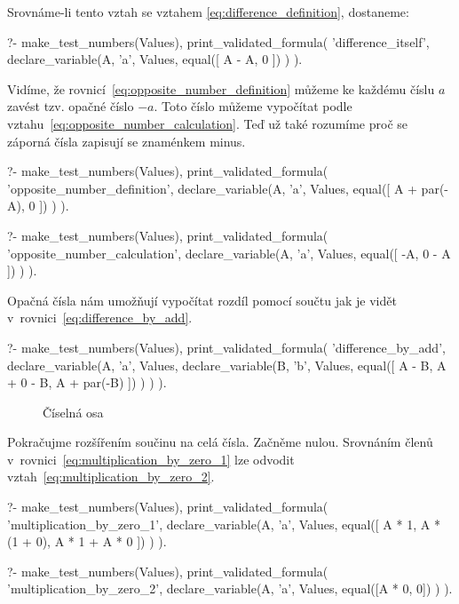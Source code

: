 Srovnáme-li tento vztah se vztahem \eqref{eq:difference_definition}, dostaneme:

\begin{prolog}
?-	make_test_numbers(Values),
	print_validated_formula(
		'difference_itself',
		declare_variable(A, 'a', Values,
			equal([
				A - A,
				0
			])
		)
	).
\end{prolog}

Vidíme, že rovnicí~\eqref{eq:opposite_number_definition} můžeme ke každému číslu \(a\) zavést tzv. opačné číslo \(-a\). Toto číslo můžeme vypočítat podle vztahu~\eqref{eq:opposite_number_calculation}. Teď už také rozumíme proč se záporná čísla zapisují se znaménkem minus.

\begin{prolog}
?-	make_test_numbers(Values),
	print_validated_formula(
		'opposite_number_definition',
		declare_variable(A, 'a', Values,
			equal([
				A + par(-A),
				0
			])
		)
	).
\end{prolog}
\begin{prolog}
?-	make_test_numbers(Values),
	print_validated_formula(
		'opposite_number_calculation',
		declare_variable(A, 'a', Values,
			equal([
				-A,
				0 - A
			])
		)
	).
\end{prolog}

Opačná čísla nám umožňují vypočítat rozdíl pomocí součtu jak je vidět v~rovnici~\eqref{eq:difference_by_add}.

\begin{prolog}
?-	make_test_numbers(Values),
	print_validated_formula(
		'difference_by_add',
		declare_variable(A, 'a', Values,
			declare_variable(B, 'b', Values,
				equal([
					A - B,
					A + 0 - B,
					A + par(-B)
				])
			)
		)
	).
\end{prolog}

\begin{figure}[!h]
\centering
{}
\caption{Číselná osa}
\label{img:integer_number_line}
\end{figure}

Pokračujme rozšířením součinu na celá čísla. Začněme nulou. Srovnáním členů v~rovnici~\eqref{eq:multiplication_by_zero_1} lze odvodit vztah~\eqref{eq:multiplication_by_zero_2}.

\begin{prolog}
?-	make_test_numbers(Values),
	print_validated_formula(
		'multiplication_by_zero_1',
		declare_variable(A, 'a', Values,
			equal([
				A * 1,
				A * (1 + 0),
				A * 1 + A * 0
			])
		)
	).
\end{prolog}
\begin{prolog}
?-	make_test_numbers(Values),
	print_validated_formula(
		'multiplication_by_zero_2',
		declare_variable(A, 'a', Values,
			equal([A * 0, 0])
		)
	).
\end{prolog}

